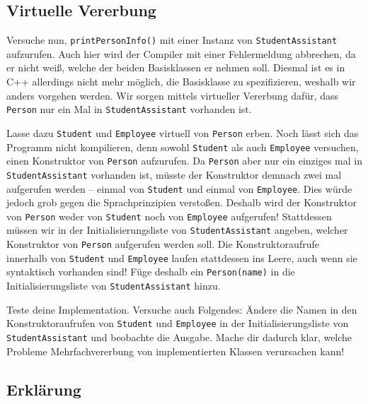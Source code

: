 \subsection{Virtuelle Vererbung}
Versuche nun, \texttt{printPersonInfo()} mit einer Instanz von \texttt{StudentAssistant} aufzurufen. Auch hier wird der Compiler mit einer Fehlermeldung abbrechen, da er nicht weiß, welche der beiden Basisklassen er nehmen soll.
Diesmal ist es in C++ allerdings nicht mehr möglich, die Basisklasse zu spezifizieren, weshalb wir anders vorgehen werden.
Wir sorgen mittels virtueller Vererbung dafür, dass \texttt{Person} nur ein Mal in \texttt{StudentAssistant} vorhanden ist.

Lasse dazu \texttt{Student} und \texttt{Employee} virtuell von \texttt{Person} erben.
Noch lässt sich das Programm nicht kompilieren, denn sowohl \texttt{Student} als auch \texttt{Employee} versuchen, einen Konstruktor von \texttt{Person} aufzurufen.
Da \texttt{Person} aber nur ein einziges mal in \texttt{StudentAssistant} vorhanden ist, müsste der Konstruktor demnach zwei mal aufgerufen werden -- einmal von \texttt{Student} und einmal von \texttt{Employee}.
Dies würde jedoch grob gegen die Sprachprinzipien verstoßen.
Deshalb wird der Konstruktor von \texttt{Person} weder von \texttt{Student} noch von \texttt{Employee} aufgerufen!
Stattdessen müssen wir in der Initialisierungsliste von \texttt{StudentAssistant} angeben, welcher Konstruktor von \texttt{Person} aufgerufen werden soll.
Die Konstruktoraufrufe innerhalb von \texttt{Student} und \texttt{Employee} laufen stattdessen ins Leere, auch wenn sie syntaktisch vorhanden sind! Füge deshalb ein \texttt{Person(name)} in die Initialisierungsliste von \texttt{StudentAssistant} hinzu.

Teste deine Implementation.
Versuche auch Folgendes: Ändere die Namen in den Konstruktoraufrufen von \texttt{Student} und \texttt{Employee} in der Initialisierungsliste von \texttt{StudentAssistant} und beobachte die Ausgabe.
Mache dir dadurch klar, welche Probleme Mehrfachvererbung von implementierten Klassen verursachen kann!

\subsection{Erklärung}

